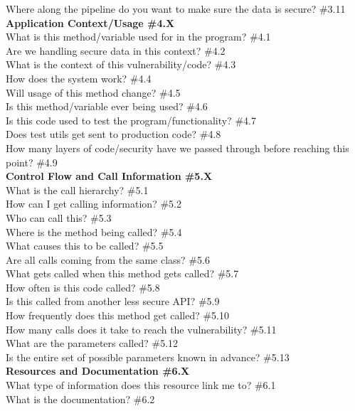 \documentclass[10pt,journal,compsoc]{IEEEtran}
\begin{document}
	Where along the pipeline do you want to make sure the data is secure? \#3.11 \\
\textbf{Application Context/Usage \#4.X} \\
	What is this method/variable used for in the program? \#4.1 \\
	Are we handling secure data in this context? \#4.2 \\
	What is the context of this vulnerability/code? \#4.3 \\
	How does the system work? \#4.4 \\
	Will usage of this method change? \#4.5 \\
	Is this method/variable ever being used? \#4.6 \\
	Is this code used to test the program/functionality? \#4.7 \\
	Does test utils get sent to production code? \#4.8 \\
	How many layers of code/security have we passed through before reaching this point? \#4.9 \\
\textbf{Control Flow and Call Information \#5.X} \\
	What is the call hierarchy?  \#5.1 \\
	How can I get calling information? \#5.2 \\
	Who can call this? \#5.3 \\
	Where is the method being called? \#5.4 \\
	What causes this to be called? \#5.5 \\
	Are all calls coming from the same class? \#5.6 \\
	What gets called when this method gets called? \#5.7 \\
	How often is this code called?  \#5.8 \\
	Is this called from another less secure API?  \#5.9 \\
	How frequently does this method get called?  \#5.10 \\
	How many calls does it take to reach the vulnerability?  \#5.11 \\
	What are the parameters called?  \#5.12 \\
	Is the entire set of possible parameters known in advance?  \#5.13 \\
\textbf{Resources and Documentation \#6.X} \\
	What type of information does this resource link me to? \#6.1 \\
	What is the documentation?  \#6.2 \\
\end{document}
